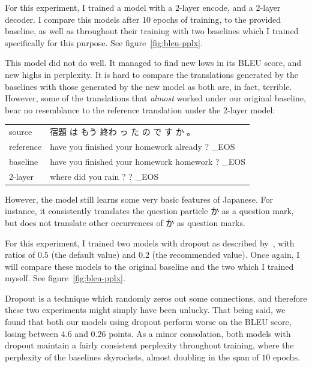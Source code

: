 \documentclass[answers]{exam}
\begin{document}
\begin{CJK}{UTF8}{min}
\begin{questions}
\begin{framed}
  For this experiment, I trained a model with a 2-layer encode, and a 2-layer
  decoder. I compare this models after 10 epochs of training, to the provided
  baseline, as well as throughout their training with two baselines which I
  trained specifically for this purpose. See figure~\ref{fig:bleu-pplx}.

  This model did not do well. It managed to find new lows in its BLEU score, and
  new highs in perplexity. It is hard to compare the translations generated by
  the baselines with those generated by the new model as both are, in fact,
  terrible. However, some of the translations that \emph{almost} worked under
  our original baseline, bear no resemblance to the reference translation under
  the 2-layer model:

  \begin{tabular}{ll}
    source    & 宿題 は もう 終わ っ た の で す か 。\\
    reference & have you finished your homework already ? \_EOS  \\
    baseline  & have you finished your homework homework ? \_EOS \\
    2-layer   & where did you rain ? ? \_EOS
  \end{tabular}

  However, the model still learns some very basic features of Japanese. For
  instance, it consistently translates the question particle か as a question
  mark, but does not translate other occurrences of か as question marks.
\end{framed}


\begin{framed}
  For this experiment, I trained two models with dropout as described
  by~\citet{Zaremba-2014}, with ratios of $0.5$ (the default value) and $0.2$
  (the recommended value). Once again, I will compare these models to the
  original baseline and the two which I trained myself. See
  figure~\ref{fig:bleu-pplx}.

  Dropout is a technique which randomly zeros out some connections, and
  therefore these two experiments might simply have been unlucky.
  That being said, we found that both our models using dropout perform worse on
  the BLEU score, losing between $4.6$ and $0.26$ points.
  As a minor consolation, both models with dropout maintain a fairly consistent
  perplexity throughout training, where the perplexity of the baselines
  skyrockets, almost doubling in the span of $10$ epochs.


\end{framed}
\end{questions}
\end{CJK}
\end{document}
